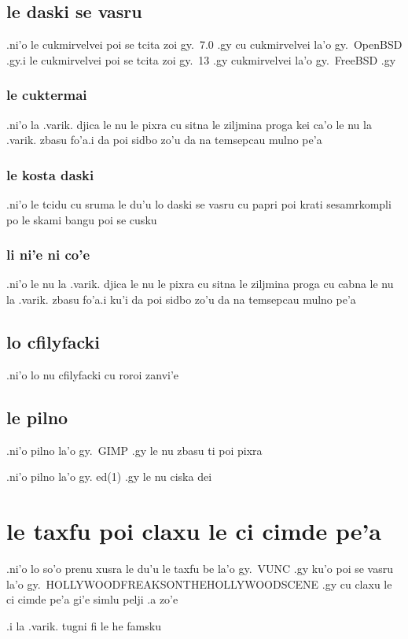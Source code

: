 \documentclass{report}
\begin{document}
\subsection{le daski se vasru}
.ni'o le cukmirvelvei poi se tcita zoi gy.\ 7.0 .gy cu cukmirvelvei la'o gy.\ OpenBSD .gy\@  .i le cukmirvelvei poi se tcita zoi gy.\ 13 .gy cukmirvelvei la'o gy.\ FreeBSD .gy

\subsubsection{le cuktermai}
.ni'o la .varik. djica le nu le pixra cu sitna le ziljmina proga kei ca'o le nu la .varik. zbasu fo'a\@  .i da poi sidbo zo'u da na temsepcau mulno pe'a

\subsubsection{le kosta daski}
.ni'o le tcidu cu sruma le du'u lo daski se vasru cu papri poi krati sesamrkompli po le skami bangu poi se cusku

\subsubsection{li ni'e ni co'e}
.ni'o le nu la .varik. djica le nu le pixra cu sitna le ziljmina proga cu cabna le nu la .varik. zbasu fo'a\@  .i ku'i da poi sidbo zo'u da na temsepcau mulno pe'a

\subsection{lo cfilyfacki}
.ni'o lo nu cfilyfacki cu roroi zanvi'e

\subsection{le pilno}
.ni'o pilno la'o gy.\ GIMP .gy le nu zbasu ti poi pixra

.ni'o pilno la'o gy. ed(1) .gy le nu ciska dei

\section{le taxfu poi claxu le ci cimde pe'a}
.ni'o lo so'o prenu xusra le du'u le taxfu be la'o gy.\ VUNC .gy ku'o poi se vasru la'o gy.\ HOLLYWOODFREAKSONTHEHOLLYWOODSCENE .gy cu claxu le ci cimde pe'a gi'e simlu pelji .a zo'e

.i la .varik. tugni fi le he famsku
\end{document}
